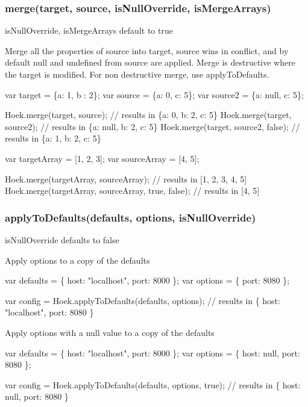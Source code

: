 \subsubsection*{merge(target, source, is\+Null\+Override, is\+Merge\+Arrays)}

is\+Null\+Override, is\+Merge\+Arrays default to true

Merge all the properties of source into target, source wins in conflict, and by default null and undefined from source are applied. Merge is destructive where the target is modified. For non destructive merge, use {\ttfamily apply\+To\+Defaults}.


\begin{DoxyCode}
var target = \{a: 1, b : 2\};
var source = \{a: 0, c: 5\};
var source2 = \{a: null, c: 5\};

Hoek.merge(target, source);         // results in \{a: 0, b: 2, c: 5\}
Hoek.merge(target, source2);        // results in \{a: null, b: 2, c: 5\}
Hoek.merge(target, source2, false); // results in \{a: 1, b: 2, c: 5\}

var targetArray = [1, 2, 3];
var sourceArray = [4, 5];

Hoek.merge(targetArray, sourceArray);              // results in [1, 2, 3, 4, 5]
Hoek.merge(targetArray, sourceArray, true, false); // results in [4, 5]
\end{DoxyCode}


\subsubsection*{apply\+To\+Defaults(defaults, options, is\+Null\+Override)}

is\+Null\+Override defaults to false

Apply options to a copy of the defaults


\begin{DoxyCode}
var defaults = \{ host: "localhost", port: 8000 \};
var options = \{ port: 8080 \};

var config = Hoek.applyToDefaults(defaults, options); // results in \{ host: "localhost", port: 8080 \}
\end{DoxyCode}


Apply options with a null value to a copy of the defaults


\begin{DoxyCode}
var defaults = \{ host: "localhost", port: 8000 \};
var options = \{ host: null, port: 8080 \};

var config = Hoek.applyToDefaults(defaults, options, true); // results in \{ host: null, port: 8080 \}
\end{DoxyCode}


